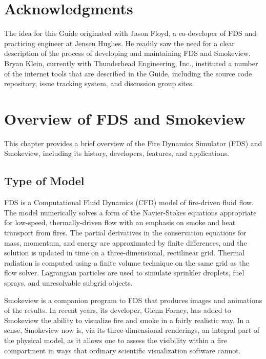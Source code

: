 \documentclass[11pt]{book}
\begin{document}



\chapter{Acknowledgments}

\label{acksection}

The idea for this Guide originated with Jason Floyd, a co-developer of FDS and practicing engineer at Jensen Hughes. He readily saw the need for a clear description of the process of developing and maintaining FDS and Smokeview. Bryan Klein, currently with Thunderhead Engineering, Inc., instituted a number of the internet tools that are described in the Guide, including the source code repository, issue tracking system, and discussion group sites.


\newpage

\tableofcontents

\mainmatter


\chapter{Overview of FDS and Smokeview}

This chapter provides a brief overview of the Fire Dynamics Simulator (FDS) and Smokeview, including its history, developers, features, and applications.


\section{Type of Model}

FDS is a Computational Fluid Dynamics (CFD) model of fire-driven fluid flow. The model numerically solves a form of the Navier-Stokes equations
appropriate for low-speed, thermally-driven flow with an emphasis on smoke and heat transport from fires. The partial derivatives in the conservation
equations for mass, momentum, and energy are approximated by finite differences, and the solution is updated in time on a three-dimensional,
rectilinear grid. Thermal radiation is computed using a finite volume technique on the same grid as the flow solver. Lagrangian particles are used to
simulate sprinkler droplets, fuel sprays, and unresolvable subgrid objects.

Smokeview is a companion program to FDS that produces images and animations of the results. In recent years, its developer, Glenn Forney, has added
to Smokeview the ability to visualize fire and smoke in a fairly realistic way. In a sense, Smokeview now is, via its three-dimensional renderings,
an integral part of the physical model, as it allows one to assess the visibility within a fire compartment in ways that ordinary scientific
visualization software cannot.
\end{document}
